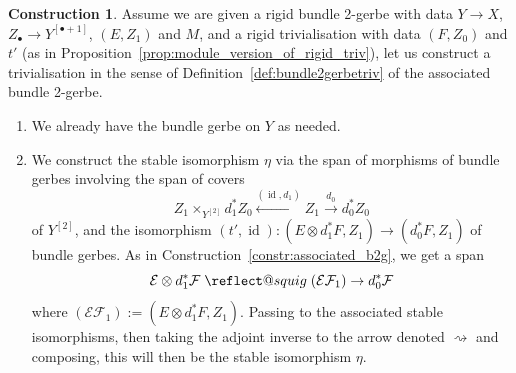 \documentclass[12pt]{amsart}
\makeatletter
\DeclareMathOperator{\id}{id}
\theoremstyle{plain}
\theoremstyle{definition}
\newtheorem{construction}[theorem]{Construction}
\theoremstyle{remark}
\numberwithin{equation}{section}
\newcommand{\cE}{{\mathcal E}}
\newcommand{\cF}{{\mathcal F}}
\newcommand{\<}{\langle}
\renewcommand{\>}{\rangle}
\providecommand{\leftsquigarrow}{%
  \mathrel{\mathpalette\reflect@squig\relax}%
}
\newcommand{\reflect@squig}[2]{%
  \reflectbox{$\m@th#1\rightsquigarrow$}%
}
\makeatother
\begin{document}
\begin{construction}\label{constr:associated_trivialisation}
Assume we are given a rigid bundle 2-gerbe with data $Y\to X$, $Z_\bullet\to Y^{[\bullet+1]}$, $(E,Z_1)$ and $M$, and a rigid trivialisation with data $(F,Z_0)$ and $t'$ (as in Proposition~\ref{prop:module_version_of_rigid_triv}), let us construct a trivialisation in the sense of Definition~\ref{def:bundle2gerbetriv} of the associated bundle 2-gerbe. 
\begin{enumerate}
\item We already have the bundle gerbe on $Y$ as needed. 
\item We construct the stable isomorphism $\eta$ via the span of morphisms of bundle gerbes involving the span of covers
\[
	 Z_1 \times_{Y^{[2]}} d_1^*Z_0 \xleftarrow{(\id,d_1)} Z_1 \xrightarrow{d_0} d_0^*Z_0
\]
of $Y^{[2]}$, and the isomorphism $(t',\id)\colon (E\otimes d_1^*F,Z_1)\to (d_0^*F,Z_1)$ of bundle gerbes.
As in Construction~\ref{constr:associated_b2g}, we get a span
\[
	\cE\otimes d_1^*\cF \leftsquigarrow (\cE\cF_1) \to d_0^*\cF
\]
where $(\cE\cF_1) := ( E\otimes d_1^*F,Z_1)$. 
Passing to the associated stable isomorphisms, then taking the adjoint inverse to the arrow denoted $\rightsquigarrow$ and composing, this will then be the stable isomorphism $\eta$.


\end{enumerate}
\end{construction}
\end{document}
